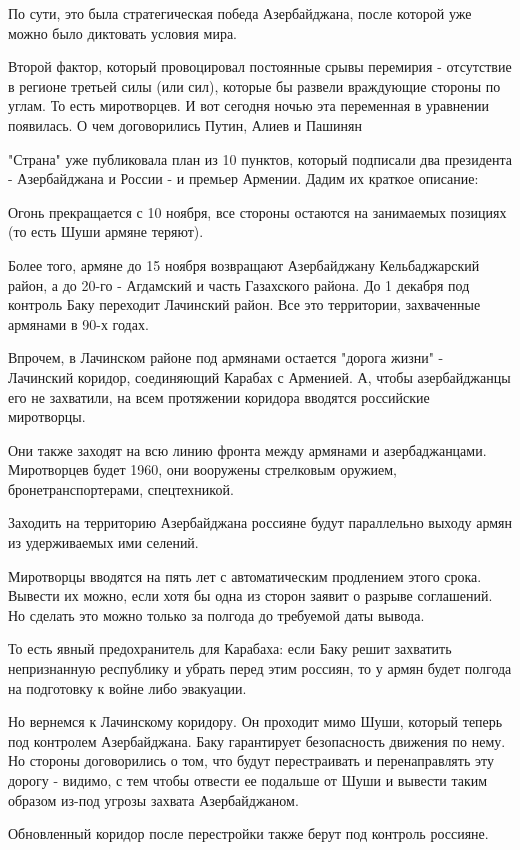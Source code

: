По сути, это была стратегическая победа Азербайджана, после которой уже можно было диктовать условия мира. 

Второй фактор, который провоцировал постоянные срывы перемирия - отсутствие в регионе третьей силы (или сил), которые бы развели враждующие стороны по углам. То есть миротворцев. И вот сегодня ночью эта переменная в уравнении появилась. 
О чем договорились Путин, Алиев и Пашинян  

"Страна" уже публиковала план из 10 пунктов, который подписали два президента - Азербайджана и России - и премьер Армении. Дадим их краткое описание: 

Огонь прекращается с 10 ноября, все стороны остаются на занимаемых позициях (то есть Шуши армяне теряют).

Более того, армяне до 15 ноября возвращают Азербайджану Кельбаджарский район, а до 20-го - Агдамский и часть Газахского района. До 1 декабря под контроль Баку переходит Лачинский район. Все это территории, захваченные армянами в 90-х годах.  

Впрочем, в Лачинском районе под армянами остается "дорога жизни" - Лачинский коридор, соединяющий Карабах с Арменией. А, чтобы азербайджанцы его не захватили, на всем протяжении коридора вводятся российские миротворцы.

Они также заходят на всю линию фронта между армянами и азербаджанцами. Миротворцев будет 1960, они вооружены стрелковым оружием, бронетранспортерами, спецтехникой.

Заходить на территорию Азербайджана россияне будут параллельно выходу армян из удерживаемых ими селений. 

Миротворцы вводятся на пять лет с автоматическим продлением этого срока. Вывести их можно, если хотя бы одна из сторон заявит о разрыве соглашений. Но сделать это можно только за полгода до требуемой даты вывода.

То есть явный предохранитель для Карабаха: если Баку решит захватить непризнанную республику и убрать перед этим россиян, то у армян будет полгода на подготовку к войне либо эвакуации. 

Но вернемся к Лачинскому коридору. Он проходит мимо Шуши, который теперь под контролем Азербайджана. Баку гарантирует безопасность движения по нему. Но стороны договорились о том, что будут перестраивать и перенаправлять эту дорогу - видимо, с тем чтобы отвести ее подальше от Шуши и вывести таким образом из-под угрозы захвата Азербайджаном.

Обновленный коридор после перестройки также берут под контроль россияне. 

